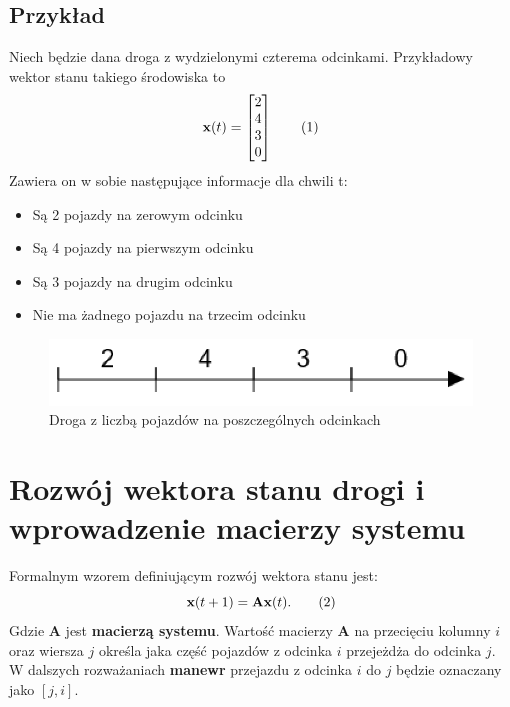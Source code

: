 \documentclass[12pt]{book}
\theoremstyle{plain}
\newcommand\addtag{\refstepcounter{equation}
\renewcommand{\labelenumii}{\theenumii}
\renewcommand{\theenumii}{\theenumi.\arabic{enumii}.}
\tag{\theequation}}
\newcommand{\myref}[1]{(\ref{#1})}
\begin{document}
\subsection*{Przykład} \label{subsec:example-single-road}
Niech będzie dana droga z wydzielonymi czterema odcinkami. Przykładowy wektor stanu takiego środowiska to
\[\textbf{x}(t)=\begin{bmatrix}
2 \\ 4 \\ 3 \\ 0
\end{bmatrix} \addtag \]
Zawiera on w sobie następujące informacje dla chwili t:
\begin{itemize}
	\item Są 2 pojazdy na zerowym odcinku
	\item Są 4 pojazdy na pierwszym odcinku
	\item Są 3 pojazdy na drugim odcinku
	\item Nie ma żadnego pojazdu na trzecim odcinku
\end{itemize}

\begin{figure}[H]
	\centering
	\includegraphics[width=14cm]{images/1_droga_4_odcinki}
	\caption{Droga z liczbą pojazdów na poszczególnych odcinkach}
	\label{fig:single_road}
\end{figure}
\section{Rozwój wektora stanu drogi i wprowadzenie macierzy systemu} \label{sec:macierz_systemu_def}
Formalnym wzorem definiującym rozwój wektora stanu jest:
\[\textbf{x}(t+1)=\textbf{Ax}(t). \addtag \label{eq:single_road} \]
Gdzie $\textbf{A}$ jest \textbf{macierzą systemu}. Wartość macierzy $\textbf{A}$ na przecięciu kolumny $i$ oraz wiersza $j$  określa jaka część pojazdów z odcinka $i$ przejeżdża do odcinka $j$. W dalszych rozważaniach \textbf{manewr} przejazdu z odcinka $i$ do $j$ będzie oznaczany jako $[j,i]$.

\end{document}
